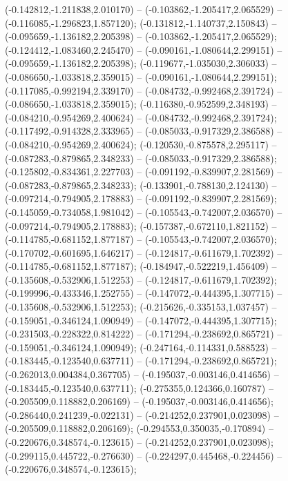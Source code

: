  (-0.142812,-1.211838,2.010170) -- (-0.103862,-1.205417,2.065529) -- (-0.116085,-1.296823,1.857120);
 (-0.131812,-1.140737,2.150843) -- (-0.095659,-1.136182,2.205398) -- (-0.103862,-1.205417,2.065529);
 (-0.124412,-1.083460,2.245470) -- (-0.090161,-1.080644,2.299151) -- (-0.095659,-1.136182,2.205398);
 (-0.119677,-1.035030,2.306033) -- (-0.086650,-1.033818,2.359015) -- (-0.090161,-1.080644,2.299151);
 (-0.117085,-0.992194,2.339170) -- (-0.084732,-0.992468,2.391724) -- (-0.086650,-1.033818,2.359015);
 (-0.116380,-0.952599,2.348193) -- (-0.084210,-0.954269,2.400624) -- (-0.084732,-0.992468,2.391724);
 (-0.117492,-0.914328,2.333965) -- (-0.085033,-0.917329,2.386588) -- (-0.084210,-0.954269,2.400624);
 (-0.120530,-0.875578,2.295117) -- (-0.087283,-0.879865,2.348233) -- (-0.085033,-0.917329,2.386588);
 (-0.125802,-0.834361,2.227703) -- (-0.091192,-0.839907,2.281569) -- (-0.087283,-0.879865,2.348233);
 (-0.133901,-0.788130,2.124130) -- (-0.097214,-0.794905,2.178883) -- (-0.091192,-0.839907,2.281569);
 (-0.145059,-0.734058,1.981042) -- (-0.105543,-0.742007,2.036570) -- (-0.097214,-0.794905,2.178883);
 (-0.157387,-0.672110,1.821152) -- (-0.114785,-0.681152,1.877187) -- (-0.105543,-0.742007,2.036570);
 (-0.170702,-0.601695,1.646217) -- (-0.124817,-0.611679,1.702392) -- (-0.114785,-0.681152,1.877187);
 (-0.184947,-0.522219,1.456409) -- (-0.135608,-0.532906,1.512253) -- (-0.124817,-0.611679,1.702392);
 (-0.199996,-0.433346,1.252755) -- (-0.147072,-0.444395,1.307715) -- (-0.135608,-0.532906,1.512253);
 (-0.215626,-0.335153,1.037457) -- (-0.159051,-0.346124,1.090949) -- (-0.147072,-0.444395,1.307715);
 (-0.231503,-0.228322,0.814222) -- (-0.171294,-0.238692,0.865721) -- (-0.159051,-0.346124,1.090949);
 (-0.247164,-0.114331,0.588523) -- (-0.183445,-0.123540,0.637711) -- (-0.171294,-0.238692,0.865721);
 (-0.262013,0.004384,0.367705) -- (-0.195037,-0.003146,0.414656) -- (-0.183445,-0.123540,0.637711);
 (-0.275355,0.124366,0.160787) -- (-0.205509,0.118882,0.206169) -- (-0.195037,-0.003146,0.414656);
 (-0.286440,0.241239,-0.022131) -- (-0.214252,0.237901,0.023098) -- (-0.205509,0.118882,0.206169);
 (-0.294553,0.350035,-0.170894) -- (-0.220676,0.348574,-0.123615) -- (-0.214252,0.237901,0.023098);
 (-0.299115,0.445722,-0.276630) -- (-0.224297,0.445468,-0.224456) -- (-0.220676,0.348574,-0.123615);
